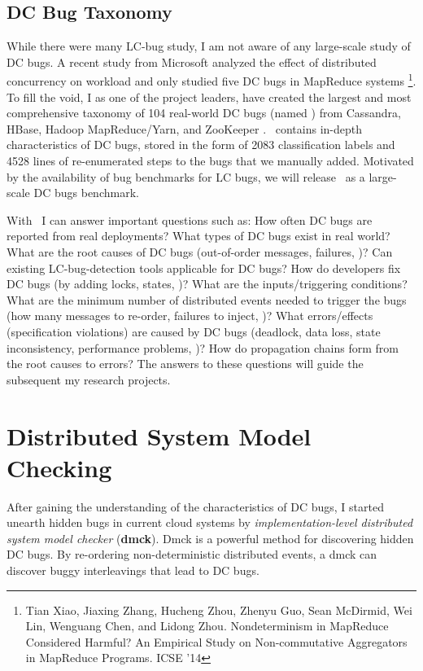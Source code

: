 \documentclass[11pt]{article}
\begin{document}
\subsection{DC Bug Taxonomy} 

While there were many LC-bug study, I am not aware of any large-scale study of
DC bugs. A recent study from Microsoft analyzed the effect of distributed
concurrency on workload and only studied five DC bugs in MapReduce systems
\footnote{Tian Xiao, Jiaxing Zhang, Hucheng Zhou, Zhenyu Guo, Sean McDirmid, Wei
Lin, Wenguang Chen, and Lidong Zhou. Nondeterminism in MapReduce Considered
Harmful?  An Empirical Study on Non-commutative Aggregators in MapReduce
Programs. ICSE '14}. To fill the void, I as one of the project leaders, have
created the largest and most comprehensive taxonomy of 104 real-world DC bugs
(named \taxdc) from Cassandra, HBase, Hadoop MapReduce/Yarn, and ZooKeeper
\cite{Gunawi+16-TaxDc-Appear}. \taxdc\ contains in-depth characteristics of DC
bugs, stored in the form of 2083 classification labels and 4528 lines of
re-enumerated steps to the bugs that we manually added. Motivated by the
availability of bug benchmarks for LC bugs, we will release \taxdc\ as a
large-scale DC bugs benchmark.

With \taxdc\, I can answer important questions such as: How often DC bugs are
reported from real deployments? What types of DC bugs exist in real world?
What are the root causes of DC bugs (out-of-order messages, failures, \etc)?
Can existing LC-bug-detection tools applicable for DC bugs? How do developers
fix DC bugs (by adding locks, states, \etc)? What are the inputs/triggering
conditions?  What are the minimum number of distributed events needed to
trigger the bugs (how many messages to re-order, failures to inject, \etc)?
What errors/effects (specification violations) are caused by DC bugs (deadlock,
data loss, state inconsistency, performance problems, \etc)? How do propagation
chains form from the root causes to errors? The answers to these questions will
guide the subsequent my research projects.

\section{Distributed System Model Checking}

After gaining the understanding of the characteristics of DC bugs, I started
unearth hidden bugs in current cloud systems by \textit{implementation-level
distributed system model checker} (\textbf{dmck}). Dmck is a powerful method for
discovering hidden DC bugs. By re-ordering non-deterministic distributed events,
a dmck can discover buggy interleavings that lead to DC bugs.
\fi
\end{document}
